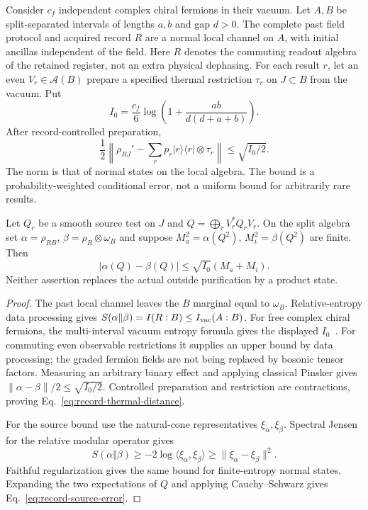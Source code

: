 \begin{proposition}
\label{prop:record-thermal-renewal}
Consider $c_f$ independent complex chiral fermions in their vacuum.
Let $A,B$ be split-separated intervals of lengths $a,b$ and gap
$d>0$. The complete past field protocol and acquired record $R$
are a normal local channel on $A$, with initial ancillas independent
of the field. Here $R$ denotes the commuting readout algebra of
the retained register, not an extra physical dephasing.
For each result $r$, let an even $V_r\in\mathcal A(B)$ prepare a
specified thermal restriction $\tau_r$ on $J\subset B$ from the vacuum.
Put
\[
 I_0=\frac{c_f}{6}\log\left(1+\frac{ab}{d(d+a+b)}\right).
\]
After record-controlled preparation,
\begin{equation}\label{eq:record-thermal-distance}
 \frac12\left\|\rho_{RJ}'-
      \sum_r p_r|r\rangle\langle r|\otimes\tau_r\right\|
       \le\sqrt{I_0/2}.
\end{equation}
The norm is that of normal states on the local algebra. The bound
is a probability-weighted conditional error, not a uniform bound
for arbitrarily rare results.

Let $Q_r$ be a smooth source test on $J$ and
$Q=\bigoplus_r V_r^*Q_rV_r$. On the split algebra set
$\alpha=\rho_{RB}$, $\beta=\rho_R\otimes\omega_B$ and suppose
$M_a^2=\alpha(Q^2)$, $M_i^2=\beta(Q^2)$ are finite. Then
\begin{equation}\label{eq:record-source-error}
 |\alpha(Q)-\beta(Q)|\le\sqrt{I_0}(M_a+M_i).
\end{equation}
Neither assertion replaces the actual outside purification by a
product state.
\end{proposition}
\begin{proof}
The past local channel leaves the $B$ marginal equal to $\omega_B$.
Relative-entropy data processing gives
$S(\alpha\Vert\beta)=I(R:B)\le I_{\rm vac}(A:B)$.
For free complex chiral fermions, the multi-interval vacuum entropy
formula gives the displayed $I_0$~\cite[Section~4.1, Eq.~(63)]{CasiniHuerta2009}.
For commuting even observable restrictions it supplies an upper
bound by data processing; the graded fermion fields are not being
replaced by bosonic tensor factors. Measuring an arbitrary binary
effect and applying classical Pinsker gives
$\|\alpha-\beta\|/2\le\sqrt{I_0/2}$.
Controlled preparation and restriction are contractions, proving
Eq.~\eqref{eq:record-thermal-distance}.

For the source bound use the natural-cone representatives
$\xi_\alpha,\xi_\beta$. Spectral Jensen for the relative modular
operator gives~\cite[Section~2, Eqs.~(2.1)--(2.6)]{Araki1976}
\[
 S(\alpha\Vert\beta)\ge
 -2\log\langle\xi_\alpha,\xi_\beta\rangle
 \ge\|\xi_\alpha-\xi_\beta\|^2.
\]
Faithful regularization gives the same bound for finite-entropy
normal states. Expanding the two expectations of $Q$ and applying
Cauchy--Schwarz gives Eq.~\eqref{eq:record-source-error}.
\end{proof}

